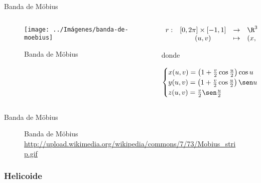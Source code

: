 \documentclass[10pt]{beamer}
\begin{document}
	\begin{frame}{Banda de Möbius}
		\begin{columns}[t] %
			\begin{column}{.50\textwidth}
				\begin{figure}
					\centering
					\texttt{[image: ../Imágenes/banda-de-moebius]}
					\caption{Banda de Möbius}
					\label{fig:banda-de-moebius}
				\end{figure}
			\end{column}%
			\hfill%
			\begin{column}{.50\textwidth}
				$$\begin{array}{rcll}
				r : & [0, 2\pi] \times [-1,1] & \to & \R^3\\
				& (u,v) & \mapsto & (x,y,z)
				\end{array}$$
				
				donde 
				
				$$ \begin{cases}
				x(u,v) = \left( 1 + \frac{v}{2}\cos\frac{u}{2} \right)\cos u \\
				y(u,v) = \left( 1 + \frac{v}{2}\cos\frac{u}{2} \right)\sen u \\
				z(u,v) = \frac{v}{2}\sen\frac{u}{2}
				\end{cases} $$
			\end{column}%
		\end{columns}
	\end{frame}
	
	\begin{frame}{Banda de Möbius}
	\begin{figure}
		\centering
		\caption{Banda de Möbius \url{http://upload.wikimedia.org/wikipedia/commons/7/73/Mobius_strip.gif}}
		\label{fig:banda-de-Moebius-gif}
	\end{figure}
		
	\end{frame}
	
	\subsubsection{Helicoide}
	
\end{document}
